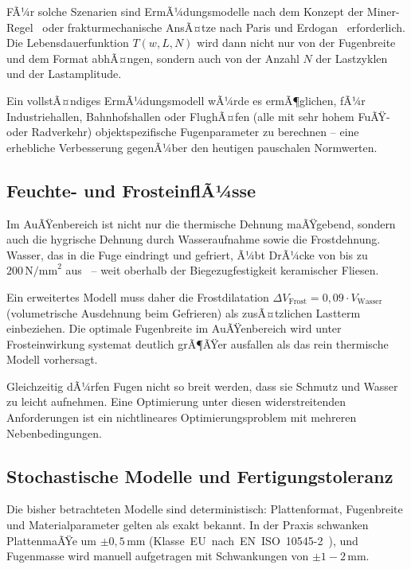 ﻿\documentclass[a4paper,12pt]{article}
\theoremstyle{definition}
\begin{document}
FÃ¼r solche Szenarien sind ErmÃ¼dungsmodelle nach dem Konzept der
Miner-Regel~\cite{miner1945} oder frakturmechanische AnsÃ¤tze
nach Paris und Erdogan~\cite{paris1963} erforderlich. Die
Lebensdauerfunktion $T(w, L, N)$ wird dann nicht nur von der
Fugenbreite und dem Format abhÃ¤ngen, sondern auch von der
Anzahl $N$ der Lastzyklen und der Lastamplitude.

Ein vollstÃ¤ndiges ErmÃ¼dungsmodell wÃ¼rde es ermÃ¶glichen,
fÃ¼r Industriehallen, Bahnhofshallen oder FlughÃ¤fen (alle mit sehr
hohem FuÃŸ- oder Radverkehr) objektspezifische Fugenparameter zu
berechnen -- eine erhebliche Verbesserung gegenÃ¼ber den heutigen
pauschalen Normwerten.

\subsection{Feuchte- und FrosteinflÃ¼sse}

Im AuÃŸenbereich ist nicht nur die thermische Dehnung maÃŸgebend,
sondern auch die hygrische Dehnung durch Wasseraufnahme sowie
die Frostdehnung. Wasser, das in die Fuge eindringt und gefriert,
Ã¼bt DrÃ¼cke von bis zu $200\,\text{N/mm}^2$ aus~\cite{powers1945} --
weit oberhalb der Biegezugfestigkeit keramischer Fliesen.

Ein erweitertes Modell muss daher die Frostdilatation
$\Delta V_{\text{Frost}} = 0{,}09 \cdot V_{\text{Wasser}}$
(volumetrische Ausdehnung beim Gefrieren) als zusÃ¤tzlichen
Lastterm einbeziehen. Die optimale Fugenbreite im AuÃŸenbereich
wird unter Frosteinwirkung systemat deutlich grÃ¶ÃŸer ausfallen
als das rein thermische Modell vorhersagt.

Gleichzeitig dÃ¼rfen Fugen nicht so breit werden, dass sie
Schmutz und Wasser zu leicht aufnehmen. Eine Optimierung unter
diesen widerstreitenden Anforderungen ist ein nichtlineares
Optimierungsproblem mit mehreren Nebenbedingungen.

\subsection{Stochastische Modelle und Fertigungstoleranz}

Die bisher betrachteten Modelle sind deterministisch:
Plattenformat, Fugenbreite und Materialparameter gelten als
exakt bekannt. In der Praxis schwanken PlattenmaÃŸe um
$\pm 0{,}5\,\text{mm}$ (Klasse~EU~nach~EN~ISO~10545-2~\cite{en10545}),
und Fugenmasse wird manuell aufgetragen mit Schwankungen von
$\pm 1{-}2\,\text{mm}$.
\end{document}
